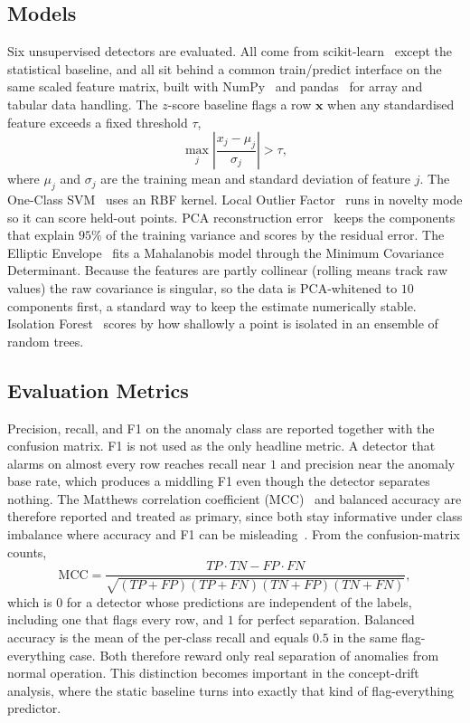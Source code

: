 \documentclass[runningheads]{llncs}
\begin{document}
\subsection{Models}
Six unsupervised detectors are evaluated. All come from
scikit-learn~\cite{pedregosa2011} except the statistical baseline, and all sit
behind a common train/predict interface on the same scaled feature matrix, built
with NumPy~\cite{harris2020} and pandas~\cite{mckinney2010} for array and
tabular data handling. The
$z$-score baseline flags a row $\mathbf{x}$ when any standardised feature exceeds
a fixed threshold $\tau$,
\begin{equation}
\max_{j}\left| \frac{x_j - \mu_j}{\sigma_j} \right| > \tau,
\end{equation}
where $\mu_j$ and $\sigma_j$ are the training mean and standard deviation of
feature $j$. The One-Class SVM~\cite{scholkopf2001}
uses an RBF kernel. Local Outlier Factor~\cite{breunig2000} runs in novelty mode
so it can score held-out points. PCA reconstruction error~\cite{shyu2003} keeps
the components that explain $95\%$ of the training variance and scores by the
residual error. The Elliptic Envelope~\cite{rousseeuw1999} fits a Mahalanobis
model through the Minimum Covariance Determinant. Because the features are partly
collinear (rolling means track raw values) the raw covariance is singular, so the
data is PCA-whitened to $10$ components first, a standard way to keep the estimate
numerically stable. Isolation Forest~\cite{liu2008} scores by how shallowly a
point is isolated in an ensemble of random trees.

\subsection{Evaluation Metrics}
Precision, recall, and F1 on the anomaly class are reported together with the
confusion matrix. F1 is not used as the only headline metric. A detector that
alarms on almost every row reaches recall near $1$ and precision near the anomaly
base rate, which produces a middling F1 even though the detector separates
nothing. The Matthews correlation coefficient (MCC)~\cite{matthews1975} and
balanced accuracy are therefore reported and treated as primary, since both stay
informative under class imbalance where accuracy and F1 can be
misleading~\cite{powers2011}. From the
confusion-matrix counts,
\begin{equation}
\mathrm{MCC} = \frac{TP\cdot TN - FP\cdot FN}
{\sqrt{(TP{+}FP)(TP{+}FN)(TN{+}FP)(TN{+}FN)}},
\end{equation}
which is $0$ for a detector whose predictions are independent of the labels,
including one that flags every row, and $1$ for perfect separation. Balanced
accuracy is the mean of the per-class recall and equals $0.5$ in the same
flag-everything case. Both therefore reward only real separation of anomalies
from normal operation. This distinction becomes important in the concept-drift
analysis, where the static baseline turns into exactly that kind of
flag-everything predictor.
\end{document}

